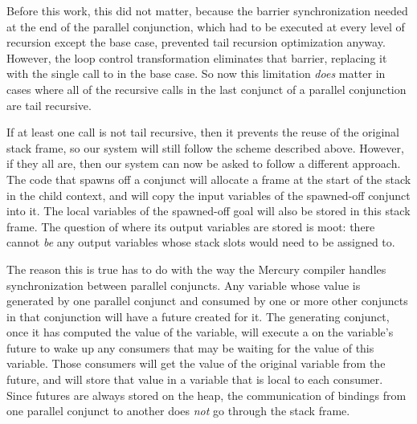 Before this work, this did not matter, because
the barrier synchronization needed at the end of the parallel conjunction,
which had to be executed at every level of recursion except the base case,
prevented tail recursion optimization anyway.
However, the loop control transformation eliminates that barrier,
replacing it with the single call to  in the base case.
So now this limitation \emph{does} matter in cases
where all of the recursive calls in the last conjunct of a parallel conjunction
are tail recursive.

If at least one call is not tail recursive,
then it prevents the reuse of the original stack frame,
so our system will still follow the scheme described above.
However, if they all are,
then our system can now be asked to follow a different approach.
The code that spawns off a conjunct
will allocate a frame at the start of the stack in the child context,
and will copy the input variables of the spawned-off conjunct into it.
The local variables of the spawned-off goal
will also be stored in this stack frame.
The question of where its output variables are stored is moot:
there cannot \emph{be} any output variables
whose stack slots would need to be assigned to.

The reason this is true has to do with the way
the Mercury compiler handles synchronization between parallel conjuncts.
Any variable whose value is generated by one parallel conjunct
and consumed by one or more other conjuncts in that conjunction
will have a future created for it.
The generating conjunct, once it has computed the value of the variable,
will execute a  on the variable's future
to wake up any consumers that may be waiting for the value of this variable.
Those consumers will get the value of the original variable from the future,
and will store that value in a variable that is local to each consumer.
Since futures are always stored on the heap,
the communication of bindings from one parallel conjunct to another
does \emph{not} go through the stack frame.


